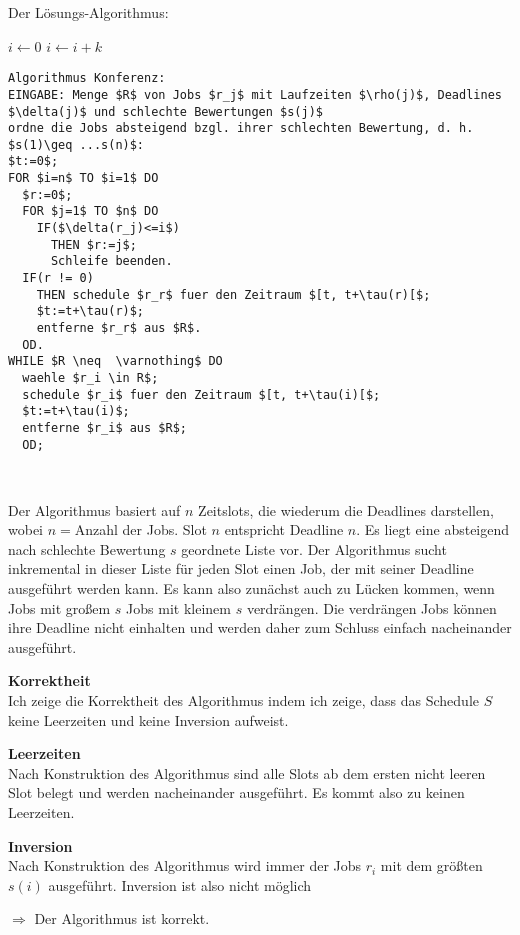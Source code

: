 \documentclass[a4paper, fontsize=10pt]{scrartcl}
\begin{document}
Der Lösungs-Algorithmus:

\begin{algorithmic}
    \State $i\gets 0$
\Else
        \State $i\gets i+k$
    \EndIf
\EndIf
\end{algorithmic}

\begin{lstlisting}[mathescape]
Algorithmus Konferenz:
EINGABE: Menge $R$ von Jobs $r_j$ mit Laufzeiten $\rho(j)$, Deadlines $\delta(j)$ und schlechte Bewertungen $s(j)$
ordne die Jobs absteigend bzgl. ihrer schlechten Bewertung, d. h. $s(1)\geq ...s(n)$:
$t:=0$;
FOR $i=n$ TO $i=1$ DO
  $r:=0$;
  FOR $j=1$ TO $n$ DO
    IF($\delta(r_j)<=i$)
      THEN $r:=j$;
      Schleife beenden.
  IF(r != 0)
    THEN schedule $r_r$ fuer den Zeitraum $[t, t+\tau(r)[$; 
    $t:=t+\tau(r)$; 
    entferne $r_r$ aus $R$.
  OD.
WHILE $R \neq  \varnothing$ DO
  waehle $r_i \in R$;
  schedule $r_i$ fuer den Zeitraum $[t, t+\tau(i)[$;
  $t:=t+\tau(i)$;
  entferne $r_i$ aus $R$;
  OD;

  
\end{lstlisting}

Der Algorithmus basiert auf $n$ Zeitslots, die wiederum die Deadlines darstellen, wobei $n=$Anzahl der Jobs. Slot $n$ entspricht Deadline $n$. Es liegt eine absteigend nach schlechte Bewertung $s$ geordnete Liste vor. Der Algorithmus sucht inkremental in dieser Liste für jeden Slot einen Job, der mit seiner Deadline ausgeführt werden kann. Es kann also zunächst auch zu Lücken kommen, wenn Jobs mit großem $s$ Jobs mit kleinem $s$ verdrängen. Die verdrängen Jobs können ihre Deadline nicht einhalten und werden daher zum Schluss einfach nacheinander ausgeführt.\bigskip


\textbf{Korrektheit}\\
Ich zeige die Korrektheit des Algorithmus indem ich zeige, dass das Schedule $S$ keine Leerzeiten und keine Inversion aufweist.

\textbf{Leerzeiten}\\
Nach Konstruktion des Algorithmus sind alle Slots ab dem ersten nicht leeren Slot belegt und werden nacheinander ausgeführt. Es kommt also zu keinen Leerzeiten.

\textbf{Inversion}\\
Nach Konstruktion des Algorithmus wird immer der Jobs $r_i$ mit dem größten $s(i)$ ausgeführt. Inversion ist also nicht möglich

$\Longrightarrow$ Der Algorithmus ist korrekt.\bigskip
\end{document}
